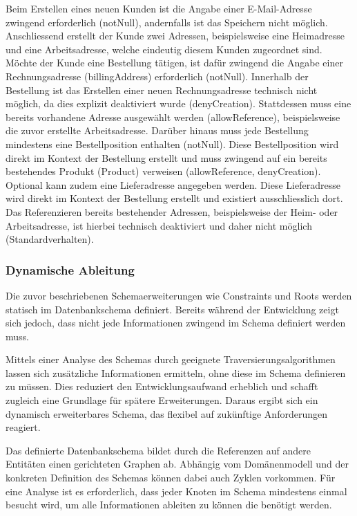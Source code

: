 Beim Erstellen eines neuen Kunden ist die Angabe einer E-Mail-Adresse zwingend erforderlich (notNull), andernfalls ist das Speichern nicht möglich. Anschliessend erstellt der Kunde zwei Adressen, beispielsweise eine Heimadresse und eine Arbeitsadresse, welche eindeutig diesem Kunden zugeordnet sind. Möchte der Kunde eine Bestellung tätigen, ist dafür zwingend die Angabe einer Rechnungsadresse (billingAddress) erforderlich (notNull). Innerhalb der Bestellung ist das Erstellen einer neuen Rechnungsadresse technisch nicht möglich, da dies explizit deaktiviert wurde (denyCreation). Stattdessen muss eine bereits vorhandene Adresse ausgewählt werden (allowReference), beispielsweise die zuvor erstellte Arbeitsadresse. Darüber hinaus muss jede Bestellung mindestens eine Bestellposition enthalten (notNull). Diese Bestellposition wird direkt im Kontext der Bestellung erstellt und muss zwingend auf ein bereits bestehendes Produkt (Product) verweisen (allowReference, denyCreation). Optional kann zudem eine Lieferadresse angegeben werden. Diese Lieferadresse wird direkt im Kontext der Bestellung erstellt und existiert ausschliesslich dort. Das Referenzieren bereits bestehender Adressen, beispielsweise der Heim- oder Arbeitsadresse, ist hierbei technisch deaktiviert und daher nicht möglich (Standardverhalten).

\subsubsection{Dynamische Ableitung}
Die zuvor beschriebenen Schemaerweiterungen wie Constraints und Roots werden statisch im Datenbankschema definiert. Bereits während der Entwicklung zeigt sich jedoch, dass nicht jede 
Informationen  zwingend im Schema definiert werden muss. 

Mittels einer Analyse des Schemas durch geeignete Traversierungsalgorithmen lassen sich zusätzliche Informationen ermitteln, ohne diese  im Schema definieren zu müssen. Dies reduziert den Entwicklungsaufwand erheblich und schafft zugleich eine  Grundlage für spätere Erweiterungen.  Daraus ergibt sich ein dynamisch erweiterbares Schema, das flexibel auf zukünftige Anforderungen reagiert.

Das definierte Datenbankschema bildet durch die Referenzen auf andere Entitäten einen gerichteten Graphen ab. Abhängig vom Domänenmodell und der konkreten Definition des Schemas können dabei auch Zyklen vorkommen. Für eine Analyse ist es erforderlich, dass jeder Knoten im Schema mindestens einmal besucht wird, um alle Informationen ableiten zu können die benötigt werden.





